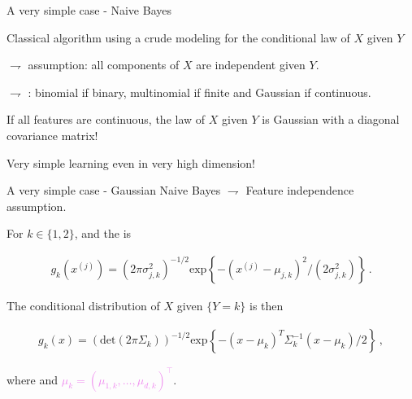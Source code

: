\documentclass[xcolor={usenames,dvipsnames},handout]{beamer}
\begin{document}
\begin{frame}{A very simple case - Naive Bayes}


Classical algorithm using a \alert{crude modeling for the conditional law of $X$ given $Y$}

\vspace{.4cm}

$\rightharpoondown$  assumption: all components of $X$ are independent given $Y$.

\vspace{.2cm}

$\rightharpoondown$ : binomial if binary, multinomial if finite and Gaussian if continuous. 

\vspace{.2cm}

If all features are continuous, the law of $X$ given $Y$ is Gaussian with a {\color{Vert} diagonal covariance matrix}!

\vspace{.2cm}

Very simple learning even in \alert{very high dimension!}

\end{frame}

\begin{frame}{A very simple case - Gaussian Naive Bayes}
$\rightharpoondown$ \alert{Feature  independence} assumption.

\vspace{.2cm}

For $k\in\{1,2\}$,  and the  is 

\begin{align*}
g_k(x^{(j)}) = (2\pi\sigma^2_{j,k})^{-1/2}\mathrm{exp}\left\{-(x^{(j)}-\mu_{j,k})^2/(2\sigma^2_{j,k})\right\}\,.
\end{align*}

\vspace{.2cm}

The conditional distribution of $X$ given $\{Y = k\}$ is then

\begin{align*}
g_k(x) = (\mathrm{det}(2\pi \Sigma_k))^{-1/2}\mathrm{exp}\left\{-(x-\mu_{k})^T\Sigma_k^{-1}(x-\mu_{k})/2\right\}\,,
\end{align*}

\vspace{.2cm}

where  and \textcolor{violet}{$\mu_k = (\mu_{1,k},\ldots,\mu_{d,k})^\top$}.

\end{frame}
\end{document}
